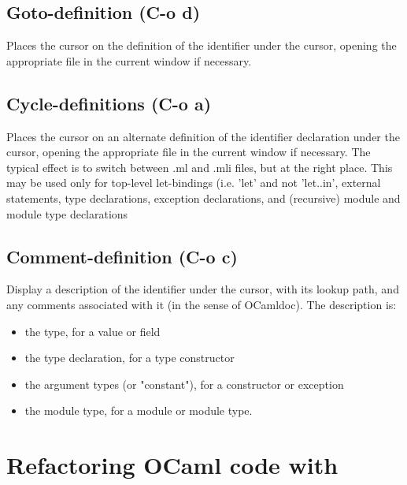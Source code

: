 \subsection{Goto-definition (C-o d)}
Places the cursor on the definition of the identifier under the cursor,
opening the appropriate file in the current window if necessary.

\subsection{Cycle-definitions (C-o a)}
Places the cursor on an alternate definition of the identifier declaration
under the cursor, opening the appropriate file in the current window
if necessary. The typical effect is to switch between .ml and .mli
files, but at the right place. This may be used only for top-level
let-bindings (i.e. 'let' and not 'let..in', external statements, type
declarations, exception declarations, and (recursive) module and
module type declarations

\subsection{Comment-definition (C-o c)}
Display a description of the identifier under the cursor, with its lookup
path,
and any comments associated with it (in the sense of OCamldoc).
The description is:
\begin{itemize}
\item the type, for a value or field
\item the type declaration, for a type constructor
\item the argument types (or "constant"), for a constructor or exception
\item the module type, for a module or module type.
\end{itemize}

\section{Refactoring OCaml code with \typerex}

